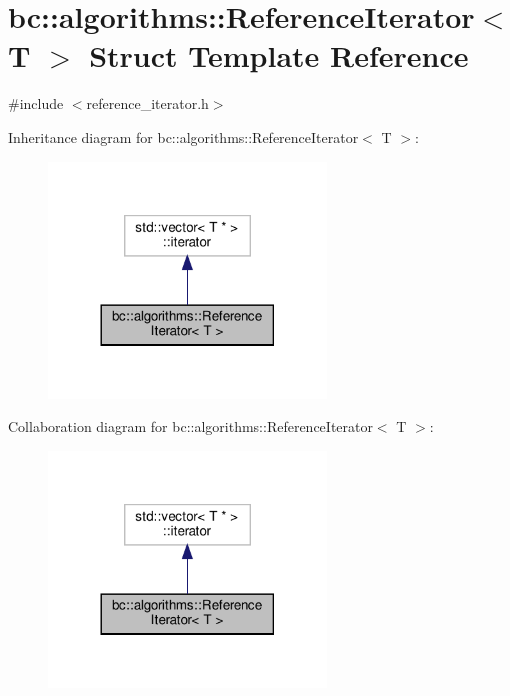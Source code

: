 \hypertarget{structbc_1_1algorithms_1_1ReferenceIterator}{}\section{bc\+:\+:algorithms\+:\+:Reference\+Iterator$<$ T $>$ Struct Template Reference}
\label{structbc_1_1algorithms_1_1ReferenceIterator}


{\ttfamily \#include $<$reference\+\_\+iterator.\+h$>$}



Inheritance diagram for bc\+:\+:algorithms\+:\+:Reference\+Iterator$<$ T $>$\+:\nopagebreak
\begin{figure}[H]
\begin{center}
\leavevmode
\includegraphics[width=209pt]{structbc_1_1algorithms_1_1ReferenceIterator__inherit__graph}
\end{center}
\end{figure}


Collaboration diagram for bc\+:\+:algorithms\+:\+:Reference\+Iterator$<$ T $>$\+:\nopagebreak
\begin{figure}[H]
\begin{center}
\leavevmode
\includegraphics[width=209pt]{structbc_1_1algorithms_1_1ReferenceIterator__coll__graph}
\end{center}
\end{figure}
